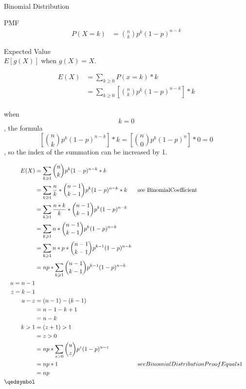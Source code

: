 \documentclass[]{article}
\begin{document}
Binomial Distribution

PMF
\begin{align}
P(X=k) &= \binom{n} {k} p^k (1-p)^{n-k}
\end{align}


Expected Value\\

$E[g(X)]$ when $g(X) = X$.

\begin{align}
E(X) &= \sum_{k \geqslant 0}P(x=k)*k\\
&= \sum_{k \geqslant 0}[\binom{n} {k} p^k (1-p)^{n-k}] * k\\
\end{align}

when $$k=0$$, the formula $$[\binom{n} {k} p^k (1-p)^{n-k}] * k = [\binom{n} {0} p^k (1-p)^n] * 0 = 0$$, so the index of the summation can be increased by 1.

\begin{align}
E(X) &= \sum_{k \geqslant 1} \binom{n}{k} p^k (1-p)^{n-k} * k\\
&= \sum_{k \geqslant 1} \frac{n}{k} * \binom{n-1}{k-1} p^k (1-p)^{n-k} * k && \text{see BinomialCoefficient}\\
&= \sum_{k \geqslant 1} \frac{n*k}{k} * \binom{n-1}{k-1} p^k (1-p)^{n-k}\\
&= \sum_{k \geqslant 1} n * \binom{n-1}{k-1} p^k (1-p)^{n-k}\\
&= \sum_{k \geqslant 1} n*p * \binom{n-1}{k-1} p^{k-1} (1-p)^{n-k}\\
&= np * \sum_{k \geqslant 1} \binom{n-1}{k-1} p^{k-1} (1-p)^{n-k}\\
u = n-1\\
z = k-1\\
u-z&=(n-1)-(k-1)\\
&=n-1-k+1\\
&=n-k\\
k>1&=(z+1)>1\\
&=z>0\\
&= np * \sum_{z>0} \binom{u}{z} p^{z} (1-p)^{u-z}\\
&= np * 1 && see BinomialDistributionProofEquals1\\
&= np\\
\qedsymbol
\end{align}
\end{document}
